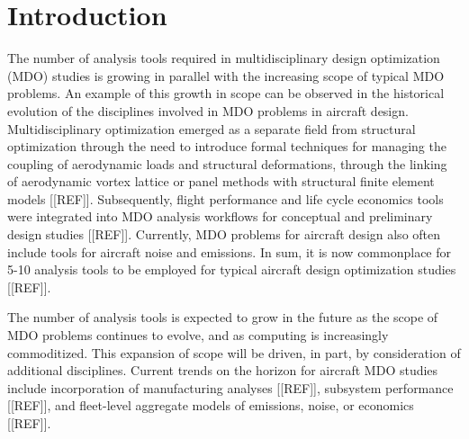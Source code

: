 \section{Introduction}
    \label{s:intro}
    The number of analysis tools required in multidisciplinary design optimization (MDO) studies is growing
    in parallel with the increasing scope of typical MDO problems. An example of this growth in scope can
    be observed in the historical evolution of the disciplines involved in MDO problems in aircraft design.
    Multidisciplinary optimization emerged as a separate field from structural optimization through the
    need to introduce formal techniques for managing the coupling of aerodynamic loads and structural
    deformations, through the linking of aerodynamic vortex lattice or panel methods with structural finite
    element models [[REF]]. Subsequently, flight performance and life cycle economics tools were integrated
    into MDO analysis workflows for conceptual and preliminary design studies [[REF]]. Currently, MDO
    problems for aircraft design also often include tools for aircraft noise and emissions. In sum, it is now
    commonplace for 5-10 analysis tools to be employed for typical aircraft design optimization studies [[REF]].
    
    The number of analysis tools is expected to grow in the future as the scope of MDO problems continues
    to evolve, and as computing is increasingly commoditized. This expansion of scope will be driven, in
    part, by consideration of additional disciplines. Current trends on the horizon for aircraft MDO studies
    include incorporation of manufacturing analyses [[REF]], subsystem performance [[REF]], and fleet-level
    aggregate models of emissions, noise, or economics [[REF]].

